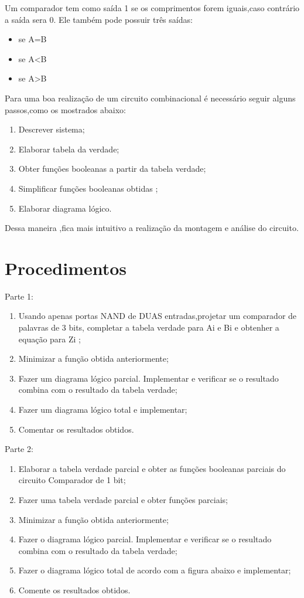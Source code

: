 \documentclass[12pt]{article}
\begin{document}
Um comparador tem como saída 1 se os comprimentos forem iguais,caso
contrário a saída sera 0.
Ele também pode possuir três saídas:

\begin{itemize}
	\item	se A=B
	\item	se A\textless B
	\item	se A\textgreater B
\end{itemize}

Para uma boa realização de um circuito combinacional é necessário seguir alguns
passos,como os mostrados abaixo:

\begin{enumerate}[label=(\alph*)]
	\item	Descrever sistema;
	\item 	Elaborar tabela da verdade;
	\item	Obter funções booleanas a partir da tabela verdade;
	\item	Simplificar funções booleanas obtidas ;
	\item	Elaborar diagrama lógico.
\end{enumerate}
Dessa maneira ,fica mais intuitivo a realização da montagem e análise do circuito.

\section{Procedimentos}
\label{sec:Procedimentos}
Parte 1:
\begin{enumerate}[label=(\roman*)]
	\item	Usando apenas portas NAND de DUAS entradas,projetar um
	comparador de palavras de 3 bits, completar a tabela verdade
	para Ai e Bi e obtenher a equação para Zi ;
	\item	Minimizar a função obtida anteriormente;
	\item	Fazer um diagrama lógico parcial. Implementar e verificar se o
	resultado combina com o resultado da tabela verdade;
	\item	Fazer um diagrama lógico total e implementar;
	\item	Comentar os resultados obtidos.
\end{enumerate}
Parte 2:
\begin{enumerate}[label=(\roman*)]
	\item	Elaborar a  tabela verdade parcial e obter as funções booleanas parciais do  circuito Comparador de 1 bit;
	\item	Fazer uma tabela verdade parcial e obter funções parciais;
	\item	Minimizar a função obtida anteriormente;
	\item	Fazer o diagrama lógico parcial. Implementar e verificar se o
	resultado combina com o resultado da tabela verdade;
	\item	Fazer o diagrama lógico total de acordo com a figura
	abaixo e implementar;
	\begin{figure}	
	\end{figure}
	\item	Comente os resultados obtidos.
\end{enumerate}
\end{document}
